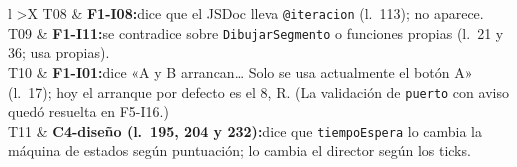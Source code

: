 \begin{xltabular}{\textwidth}{l >{\RaggedRight\arraybackslash}X}
	\midrule
	T08 & \textbf{F1-I08:}\newline dice que el JSDoc lleva \texttt{@iteracion} (l.~113); no aparece. \\
	\midrule
	T09 & \textbf{F1-I11:}\newline se contradice sobre \texttt{DibujarSegmento} o funciones propias (l.~21 y 36; usa propias). \\
	\midrule
	T10 & \textbf{F1-I01:}\newline dice «A y B arrancan\ldots{} Solo se usa actualmente el botón A» (l.~17); hoy el arranque por defecto es el 8, R. (La validación de \texttt{puerto} con aviso quedó resuelta en F5-I16.) \\
	\midrule
	T11 & \textbf{C4-diseño (l.~195, 204 y 232):}\newline dice que \texttt{tiempoEspera} lo cambia la máquina de estados según puntuación; lo cambia el director según los ticks. \\
	\bottomrule
\end{xltabular}


\clearpage